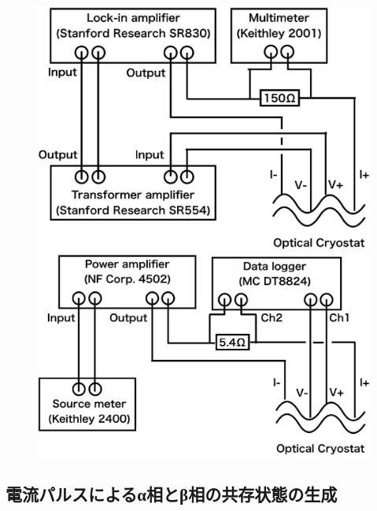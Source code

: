 \begin{figure}[htb]
 \begin{minipage}{0.5\hsize}
    \begin{center}
   \includegraphics[width=\hsize]{experiment/schematics_pulse.eps}
  \end{center}
  \caption{}
  \label{fig:schematics_pulse}
 \end{minipage}
 \begin{minipage}{0.5\hsize}
     \begin{center}
   \includegraphics[width=\hsize]{experiment/schematics_lockin.eps}
  \end{center}
  \caption{}
  \label{fig:schematics_lockin}
   \end{minipage}
\end{figure}

\subsection{電流パルスによるα相とβ相の共存状態の生成}

